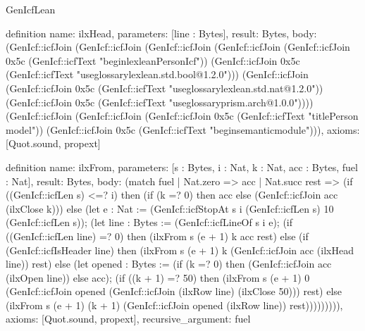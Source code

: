 \begin{lexlean}{GenIcfLean}
\begin{semanticmodule}
{definition{
  name: ilxHead,
  parameters: [line : Bytes],
  result: Bytes,
  body: (GenIcf::icfJoin (GenIcf::icfJoin (GenIcf::icfJoin (GenIcf::icfJoin (GenIcf::icfJoin 0x5c (GenIcf::icfText "begin{lexlean}{PersonIcf}\n")) (GenIcf::icfJoin 0x5c (GenIcf::icfText "useglossary{lexlean.std.bool@1.2.0}\n"))) (GenIcf::icfJoin (GenIcf::icfJoin 0x5c (GenIcf::icfText "useglossary{lexlean.std.nat@1.2.0}\n")) (GenIcf::icfJoin 0x5c (GenIcf::icfText "useglossary{prism.arch@1.0.0}\n")))) (GenIcf::icfJoin (GenIcf::icfJoin (GenIcf::icfJoin 0x5c (GenIcf::icfText "title{Person model}\n")) (GenIcf::icfJoin 0x5c (GenIcf::icfText "begin{semanticmodule}\n{}\n{}\n\n"))),
  axioms: [Quot.sound, propext]
}

definition{
  name: ilxFrom,
  parameters: [s : Bytes, i : Nat, k : Nat, acc : Bytes, fuel : Nat],
  result: Bytes,
  body: (match fuel
    | Nat.zero => acc
    | Nat.succ rest => (if ((GenIcf::icfLen s) <=? i) then (if (k =? 0) then acc else (GenIcf::icfJoin acc (ilxClose k))) else (let e : Nat := (GenIcf::icfStopAt s i (GenIcf::icfLen s) 10 (GenIcf::icfLen s)); (let line : Bytes := (GenIcf::icfLineOf s i e); (if ((GenIcf::icfLen line) =? 0) then (ilxFrom s (e + 1) k acc rest) else (if (GenIcf::icfIsHeader line) then (ilxFrom s (e + 1) k (GenIcf::icfJoin acc (ilxHead line)) rest) else (let opened : Bytes := (if (k =? 0) then (GenIcf::icfJoin acc (ilxOpen line)) else acc); (if ((k + 1) =? 50) then (ilxFrom s (e + 1) 0 (GenIcf::icfJoin opened (GenIcf::icfJoin (ilxRow line) (ilxClose 50))) rest) else (ilxFrom s (e + 1) (k + 1) (GenIcf::icfJoin opened (ilxRow line)) rest))))))))),
  axioms: [Quot.sound, propext],
  recursive_argument: fuel
}

}
\end{semanticmodule}
\end{lexlean}
